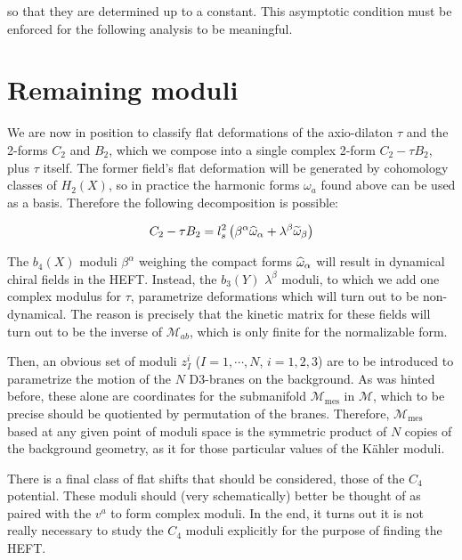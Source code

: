 so that they are determined up to a constant. This asymptotic condition must be enforced for the following analysis to be meaningful.

\section{Remaining moduli}\label{sec:hefttwo}

We are now in position to classify flat deformations of the axio-dilaton $\tau$ and the 2-forms $C_2$ and $B_2$, which we compose into a single complex 2-form $C_2 - \tau B_2$, plus $\tau$ itself. The former field's flat deformation will be generated by cohomology classes of $H_2(X)$, so in practice the harmonic forms $\omega_a$ found above can be used as a basis. Therefore the following decomposition is possible:

\begin{equation}
	C_2 - \tau B_2 = l_s^2 \left( \beta^\alpha \widehat{\omega}_\alpha + \lambda^\beta \widetilde{\omega}_\beta \right)
	\label{ABvariation}
\end{equation}

The $b_4(X)$ moduli $\beta^\alpha$ weighing the compact forms $\widehat{\omega}_\alpha$ will result in dynamical chiral fields in the HEFT. Instead, the $b_3(Y)$ $\lambda^\beta$ moduli, to which we add one complex modulus for $\tau$, parametrize deformations which will turn out to be non-dynamical. The reason is precisely that the kinetic matrix for these fields will turn out to be the inverse of $\mathcal{M}_{ab}$, which is only finite for the normalizable form.

Then, an obvious set of moduli $z_I^i$ ($I=1,\cdots,N$, $i = 1,2,3$) are to be introduced to parametrize the motion of the $N$ D3-branes on the background. As was hinted before, these alone are coordinates for the submanifold $\mathcal{M}_\text{mes}$ in $\mathcal{M}$, which to be precise should be quotiented by permutation of the branes. Therefore, $\mathcal{M}_\text{mes}$ based at any given point of moduli space is the symmetric product of $N$ copies of the background geometry, as it for those particular values of the K\"ahler moduli.

There is a final class of flat shifts that should be considered, those of the $C_4$ potential. These moduli should (very schematically) better be thought of as paired with the $v^a$ to form complex moduli. In the end, it turns out it is not really necessary to study the $C_4$ moduli explicitly for the purpose of finding the HEFT.


